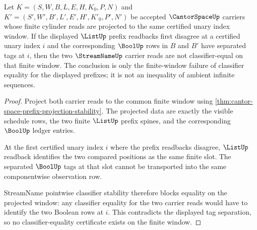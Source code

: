 \begin{theorem}
\label{thm:cantorspace-prefix-cylinder-no-confusion}
Let $K=(S,W,B,L,E,H,K_0,P,N)$ and $K'=(S',W',B',L',E',H',K'_0,P',N')$ be
accepted $\CantorSpaceUp$ carriers whose finite cylinder reads are projected to
the same certified unary index window. If the displayed $\ListUp$ prefix
readbacks first disagree at a certified unary index $i$ and the corresponding
$\BoolUp$ rows in $B$ and $B'$ have separated tags at $i$, then the two
$\StreamNameUp$ carrier reads are not classifier-equal on that finite window.
The conclusion is only the finite-window failure of classifier equality for the
displayed prefixes; it is not an inequality of ambient infinite sequences.
\end{theorem}
\begin{proof}
Project both carrier reads to the common finite window using
\autoref{thm:cantor-space-prefix-projection-stability}. The projected data are
exactly the visible schedule rows, the two finite $\ListUp$ prefix spines, and
the corresponding $\BoolUp$ ledger entries.

At the first certified unary index $i$ where the prefix readbacks disagree,
$\ListUp$ readback identifies the two compared positions as the same finite
slot. The separated $\BoolUp$ tags at that slot cannot be transported into the
same componentwise observation row.

StreamName pointwise classifier stability therefore blocks equality on the
projected window: any classifier equality for the two carrier reads would have
to identify the two Boolean rows at $i$. This contradicts the displayed
tag separation, so no classifier-equality certificate exists on the finite
window.
\end{proof}

